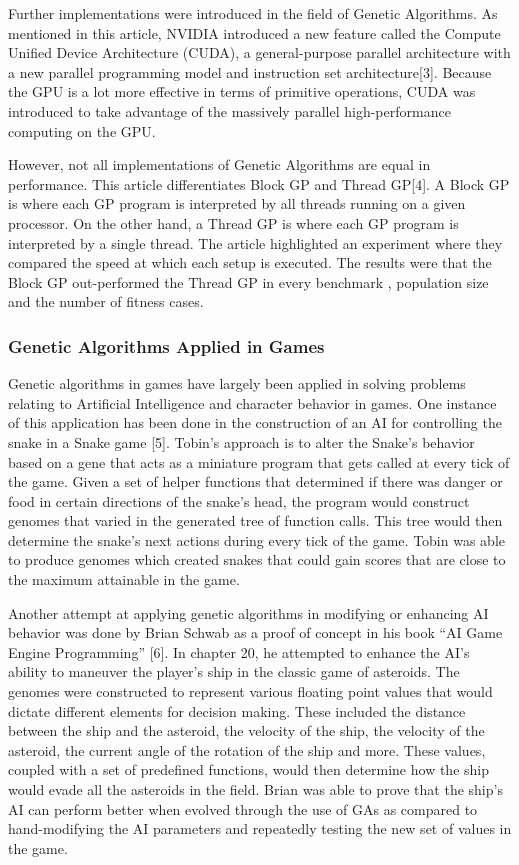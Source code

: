 	Further implementations were introduced in the field of Genetic Algorithms.  As mentioned in this article, NVIDIA introduced a new feature called the Compute Unified Device Architecture (CUDA), 
	a general-purpose parallel architecture with a new parallel programming model and instruction set architecture[3].  Because the GPU is a lot more effective in terms of primitive operations, 
	CUDA was introduced to take advantage of the massively parallel high-performance computing on the GPU.  

	However, not all implementations of Genetic Algorithms are equal in performance.  This article differentiates Block GP and Thread GP[4].  A Block GP is where each GP program is 
	interpreted by all threads running on a given processor.  On the other hand, a Thread GP is where each GP program is interpreted by a single thread.  The article 
	highlighted an experiment where they compared the speed at which each setup is executed.  The results were that the Block GP out-performed the Thread GP in every benchmark , 
	population size and the number of fitness cases.

\subsubsection*{Genetic Algorithms Applied in Games}	

	Genetic algorithms in games have largely been applied in solving problems relating to Artificial Intelligence and character behavior in games. One instance of this application 
	has been done in the construction of an AI for controlling the snake in a Snake game [5]. Tobin's approach is to alter the Snake's behavior based on a gene that acts as a miniature 
	program that gets called at every tick of the game. Given a set of helper functions that determined if there was danger or food in certain directions of the snake's head, the program 
	would construct genomes that varied in the generated tree of function calls. This tree would then determine the snake's next actions during every tick of the game. Tobin was able to 
	produce genomes which created snakes that could gain scores that are close to the maximum attainable in the game.  

	Another attempt at applying genetic algorithms in modifying or 
	enhancing AI behavior was done by Brian Schwab as a proof of concept in his book “AI Game Engine Programming” [6]. In chapter 20, he attempted to enhance the AI's ability to maneuver 
	the player's ship in the classic game of asteroids. The genomes were constructed to represent various floating point values that would dictate different elements for decision making. 
	These included the distance between the ship and the asteroid, the velocity of the ship, the velocity of the asteroid, the current angle of the rotation of the ship and more. 
	These values, coupled with a set of predefined functions, would then determine how the ship would evade all the asteroids in the field. Brian was able to prove that the ship's AI can 
	perform better when evolved through the use of GAs as compared to hand-modifying the AI parameters and repeatedly testing the new set of values in the game.
	
